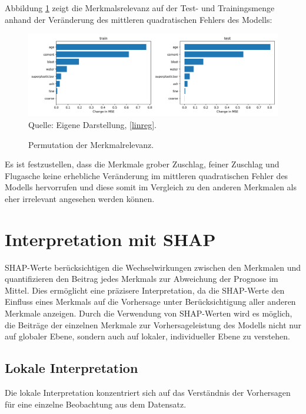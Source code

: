 Abbildung \ref{pic:permutation} zeigt die Merkmalsrelevanz auf der Test- und Trainingsmenge 
anhand der Veränderung des mittleren quadratischen Fehlers des Modells:

\begin{figure}[!h]
    \caption{Permutation der Merkmalrelevanz.}
    \includegraphics[width=1\textwidth]{../scripts/images/permutation_importance.png}
    Quelle: Eigene Darstellung, \ref{linreg}.
    \label{pic:permutation}
\end{figure}

Es ist festzustellen, dass die Merkmale grober Zuschlag, feiner Zuschlag und Flugasche keine erhebliche Veränderung im mittleren quadratischen
Fehler des Modells hervorrufen und diese somit im Vergleich zu den anderen Merkmalen als eher irrelevant angesehen werden können.

\section{Interpretation mit SHAP}

SHAP-Werte berücksichtigen die Wechselwirkungen zwischen den Merkmalen und 
quantifizieren den Beitrag jedes Merkmals zur Abweichung der Prognose im Mittel. 
Dies ermöglicht eine präzisere Interpretation, da die SHAP-Werte den Einfluss 
eines Merkmals auf die Vorhersage unter Berücksichtigung aller anderen Merkmale anzeigen. 
Durch die Verwendung von SHAP-Werten wird 
es möglich, die Beiträge der einzelnen Merkmale zur Vorhersageleistung des Modells nicht nur 
auf globaler Ebene, sondern auch auf lokaler, individueller Ebene zu verstehen. 

\subsection{Lokale Interpretation}

Die lokale Interpretation konzentriert sich auf das Verständnis der Vorhersagen 
für eine einzelne Beobachtung aus dem Datensatz.

